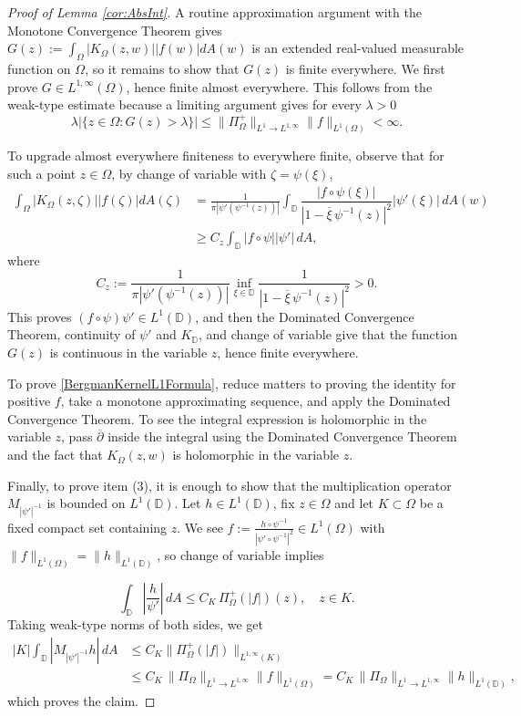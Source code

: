 \documentclass{amsart}
\theoremstyle{definition}
\numberwithin{equation}{section}
\begin{document}
 \begin{proof}[Proof of Lemma \ref{cor:AbsInt}]
 

A routine approximation argument with the Monotone Convergence Theorem gives $G(z):= \int_{\Omega}|K_{\Omega}(z,w)||f(w)|dA(w)$ is an extended real-valued measurable function on $\Omega$, so it remains to show that $G(z)$ is finite everywhere. We first prove $G \in L^{1,\infty}(\Omega)$, hence finite almost everywhere. This follows from the weak-type estimate because a limiting argument gives for every $\lambda>0$
$$ \lambda |\{z \in \Omega\colon G(z)>\lambda\}| \leq \|\Pi_{\Omega}^{+}\|_{L^1 \rightarrow L^{1,\infty}} \|f\|_{L^1(\Omega)}<\infty.  $$

To upgrade almost everywhere finiteness to everywhere finite, observe that for such a point $z \in \Omega$, by change of variable with $\zeta=\psi(\xi)$, 
\begin{align*}
\int_{\Omega}|K_{\Omega}(z,\zeta)||f(\zeta)|dA(\zeta) & = \frac{1}{\pi |\psi'(\psi^{-1}(z))|} \int_{\mathbb{D}}\dfrac{|f \circ \psi(\xi)|}{|1-\overline{\xi}\,\psi^{-1}(z)|^2} |\psi'(\xi)| \, dA(w) \\ 
& \geq C_z \int_{\mathbb{D}} |f \circ \psi| |\psi'| \, dA,
\end{align*}
where $$ C_z:=\frac{1}{\pi |\psi'(\psi^{-1}(z))|} \inf_{\xi \in \mathbb{D}} \dfrac{1}{|1-\overline{\xi}\,\psi^{-1}(z)|^2}>0. $$
This proves $(f \circ \psi) \psi' \in L^1(\mathbb{D})$, and then the Dominated Convergence Theorem, continuity of $\psi'$ and $K_{\mathbb{D}}$, and change of variable give that the function $G(z)$ is continuous in the variable $z$, hence finite everywhere.

To prove \eqref{BergmanKernelL1Formula}, reduce matters to proving the identity for positive $f$, take a monotone approximating sequence, and apply the Dominated Convergence Theorem. To see the integral expression is holomorphic in the variable $z$, pass $\overline \partial$ inside the integral using the Dominated Convergence Theorem and the fact that $K_\Omega(z,w)$ is holomorphic in the variable $z$.



Finally, to prove item (3), it is enough to show that the multiplication operator $M_{|\psi'|^{-1}}$ is bounded on $L^1(\mathbb{D}).$ Let $h \in L^1(\mathbb{D})$, fix $z \in \Omega$ and let $K \subset \Omega$ be a fixed compact set containing $z$. We see $f:=\frac{h \circ \psi^{-1}}{|\psi'\circ \psi^{-1}|^2} \in L^1(\Omega)$ with $\|f\|_{L^1(\Omega)}=\|h\|_{L^1(\mathbb{D})}$, so change of variable implies 

$$\int_{\mathbb{D}}\left \lvert \frac{h}{\psi'}  \right \rvert\, dA \leq C_K \,\Pi_{\Omega}^{+}(|f|)(z), \quad z \in K.$$
Taking weak-type norms of both sides, we get
\begin{align*}
 |K| \int_{\mathbb{D}} | M_{|\psi'|^{-1}}h | \, dA & \leq C_K \|\Pi_{\Omega}^{+}(|f|)\|_{L^{1,\infty}(K)} \\
 & \leq C_K \, \|\Pi_{\Omega}\|_{L^1 \rightarrow L^{1,\infty}} \|f\|_{L^1(\Omega)}= C_K \, \|\Pi_{\Omega}\|_{L^1 \rightarrow L^{1,\infty}} \|h\|_{L^1(\mathbb{D})},
 \end{align*}
 which proves the claim. 
\end{proof}
    



\end{document}

